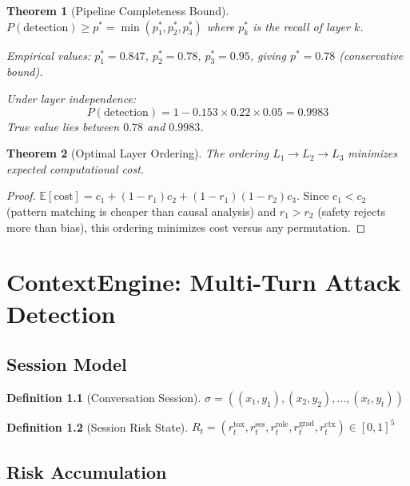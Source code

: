 \documentclass[12pt,a4paper]{report}
\theoremstyle{plain}
\newtheorem{theorem}{Theorem}[chapter]
\theoremstyle{definition}
\newtheorem{definition}[theorem]{Definition}
\theoremstyle{remark}
\newcommand{\E}{\mathbb{E}}
\begin{document}
\begin{theorem}[Pipeline Completeness Bound]
\label{thm:pipeline-complete}
$P(\text{detection}) \geq p^* = \min(p_1^*, p_2^*, p_3^*)$
where $p_k^*$ is the recall of layer $k$.

Empirical values: $p_1^* = 0.847$,
$p_2^* = 0.78$, $p_3^* = 0.95$,
giving $p^* = 0.78$ (conservative bound).

Under layer independence:
\begin{equation}
    P(\text{detection})
    = 1 - 0.153 \times 0.22 \times 0.05
    = 0.9983
\end{equation}
True value lies between $0.78$ and $0.9983$.
\end{theorem}

\begin{theorem}[Optimal Layer Ordering]
\label{thm:ordering}
The ordering $L_1 \to L_2 \to L_3$ minimizes
expected computational cost.
\end{theorem}
\begin{proof}
$\E[\text{cost}] = c_1 + (1{-}r_1)c_2 + (1{-}r_1)(1{-}r_2)c_3$.
Since $c_1 < c_2$ (pattern matching is cheaper than causal
analysis) and $r_1 > r_2$ (safety rejects more than bias),
this ordering minimizes cost versus any permutation.
\end{proof}

\chapter{ContextEngine: Multi-Turn Attack Detection}
\label{ch:context}

\section{Session Model}

\begin{definition}[Conversation Session]
$\sigma = ((x_1,y_1), (x_2,y_2), \ldots, (x_t,y_t))$
\end{definition}

\begin{definition}[Session Risk State]
$R_t = (r_t^{\text{tox}}, r_t^{\text{ses}},
r_t^{\text{role}}, r_t^{\text{grad}},
r_t^{\text{ctx}}) \in [0,1]^5$
\end{definition}

\section{Risk Accumulation}
\end{document}
